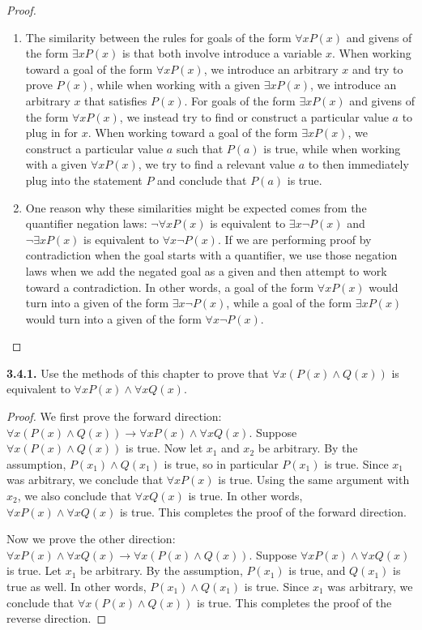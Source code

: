 \documentclass[12pt]{amsart}
\newenvironment{statement}[1]{\smallskip\noindent\color[rgb]{.6627, .3529, .6314} {\bf #1.}}{}
\theoremstyle{definition}
\theoremstyle{remark}
\begin{document}
\begin{proof}
\hfill
\begin{enumerate}
	\item The similarity between the rules for goals of the form $\forall x P(x)$
	and givens of the form $\exists x P(x)$ is that both involve introduce a variable $x$.
	When working toward a goal of the form $\forall x P(x)$, we introduce an arbitrary $x$
	and try to prove $P(x)$, while when working with a given $\exists x P(x)$,
	we introduce an arbitrary $x$ that satisfies $P(x)$.
	For goals of the form $\exists x P(x)$ and givens of the form $\forall x P(x)$, we instead
	try to find or construct a particular value $a$ to plug in for $x$.
	When working toward a goal of the form $\exists x P(x)$, we construct a particular value $a$
	such that $P(a)$ is true, while when working with a given $\forall x P(x)$, we try to find
	a relevant value $a$ to then immediately plug into the statement $P$ and conclude
	that $P(a)$ is true.
	
	\item One reason why these similarities might be expected comes from the quantifier
	negation laws: $\neg \forall x P(x)$ is equivalent to $\exists x \neg P(x)$
	and $\neg \exists x P(x)$ is equivalent to $\forall x \neg P(x)$.
	If we are performing proof by contradiction when the goal starts with a quantifier,
	we use those negation laws when we add the negated goal as a given and then
	attempt to work toward a contradiction.
	In other words, a goal of the form $\forall x P(x)$ would turn into a given of the form
	$\exists x \neg P(x)$, while a goal of the form $\exists x P(x)$ would turn into a given
	of the form $\forall x \neg P(x)$.
\end{enumerate}
\end{proof}


\begin{statement}{3.4.1}
Use the methods of this chapter to prove that $\forall x (P(x) \wedge Q(x))$ is equivalent to $\forall x P(x) \wedge \forall x Q(x)$.
\end{statement}

\begin{proof}
We first prove the forward direction: $\forall x (P(x) \wedge Q(x)) \rightarrow \forall x P(x) \wedge \forall x Q(x)$.
Suppose $\forall x (P(x) \wedge Q(x))$ is true.
Now let $x_1$ and $x_2$ be arbitrary.
By the assumption, $P(x_1) \wedge Q(x_1)$ is true, so in particular $P(x_1)$ is true.
Since $x_1$ was arbitrary, we conclude that $\forall x P(x)$ is true.
Using the same argument with $x_2$, we also conclude that $\forall x Q(x)$ is true.
In other words, $\forall x P(x) \wedge \forall x Q(x)$ is true.
This completes the proof of the forward direction.

Now we prove the other direction: $\forall x P(x) \wedge \forall x Q(x) \rightarrow \forall x (P(x) \wedge Q(x))$.
Suppose $\forall x P(x) \wedge \forall x Q(x)$ is true.
Let $x_1$ be arbitrary.
By the assumption, $P(x_1)$ is true, and $Q(x_1)$ is true as well.
In other words, $P(x_1) \wedge Q(x_1)$ is true.
Since $x_1$ was arbitrary, we conclude that $\forall x (P(x) \wedge Q(x))$ is true. This completes the proof of the reverse direction.
\end{proof}
\end{document}
